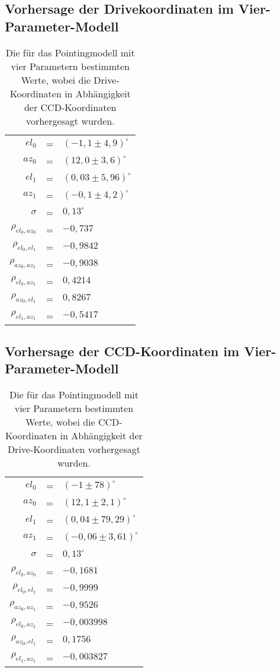 \subsection*{Vorhersage der Drivekoordinaten im Vier-Parameter-Modell}
\begin{table}[htbp]
\centering
\begin{tabular}{rcl}
\toprule
$el_0$ &=& $(-1,1\pm 4,9)^{\circ}$\\
$az_0$ &=& $(12,0\pm3,6)^{\circ}$\\
$el_1$ &=& $(0,03\pm 5,96)^{\circ}$\\
$az_1$ &=& $(-0,1\pm4,2)^{\circ}$\\
$\sigma$ &=& $0,13^{\circ}$\\
$\rho_{el_0,az_0}$ &=& $-0,737$\\
$\rho_{el_0,el_1}$ &=& $-0,9842$\\
$\rho_{az_0,az_1}$ &=& $-0,9038$\\
$\rho_{el_0,az_1}$ &=& $0,4214$\\
$\rho_{az_0,el_1}$ &=& $0,8267$\\
$\rho_{el_1,az_1}$ &=& $-0,5417$\\
\bottomrule
\end{tabular}
\caption{Die für das Pointingmodell mit vier Parametern bestimmten Werte, wobei die Drive-Koordinaten in Abhängigkeit der CCD-Koordinaten vorhergesagt wurden.}
\label{tab:C2D4-}
\end{table}
\newpage
\subsection*{Vorhersage der CCD-Koordinaten im Vier-Parameter-Modell}
\begin{table}[htbp]
\centering
\begin{tabular}{rcl}
\toprule
$el_0$ &=& $(-1\pm 78)^{\circ}$\\
$az_0$ &=& $(12,1\pm2,1)^{\circ}$\\
$el_1$ &=& $(0,04\pm 79,29)^{\circ}$\\
$az_1$ &=& $(-0,06\pm3,61)^{\circ}$\\
$\sigma$ &=& $0,13^{\circ}$\\
$\rho_{el_0,az_0}$&=& $-0,1681$\\
$\rho_{el_0,el_1}$&=& $-0,9999$\\
$\rho_{az_0,az_1}$&=& $-0,9526$\\
$\rho_{el_0,az_1}$&=& $-0,003998$\\
$\rho_{az_0,el_1}$&=& $0,1756$\\
$\rho_{el_1,az_1}$&=& $-0,003827$\\
\bottomrule
\end{tabular}
\caption{Die für das Pointingmodell mit vier Parametern bestimmten Werte, wobei die CCD-Koordinaten in Abhängigkeit der Drive-Koordinaten vorhergesagt wurden.}
\label{tab:D2C4-}
\end{table}